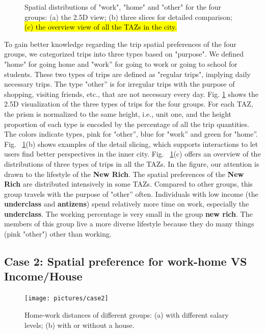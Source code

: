 \documentclass{ieeeaccess}
\begin{document}
\begin{figure}[htb!]
 \caption{Spatial distributions of "work", "home" and "other" for the four groups: (a) the 2.5D view; (b) three slices for detailed comparison; \hl{(c) the overview view of all the TAZs in the city.}}
 \label{case13}
\end{figure}

To gain better knowledge regarding the trip spatial preferences of the four groups, we categorized trips into three types based on "purpose". We defined "home" for going home and "work'' for going to work or going to school for students. These two types of trips are defined as "regular trips", implying daily necessary trips. The type "other'' is for irregular trips with the purpose of shopping, visiting friends, etc., that are not necessary every day. Fig. \ref{case13} shows the 2.5D visualization of the three types of trips for the four groups. For each TAZ, the prism is normalized to the same height, i.e., unit one, and the height proportion of each type is encoded by the percentage of all the trip quantities. The colors indicate types, pink for "other'', blue for "work'' and green for "home''. Fig. ~\ref{case13}(b) shows examples of the detail slicing, which supports interactions to let users find better perspectives in the inner city. Fig. ~\ref{case13}(c) offers an overview of the distributions of three types of trips in all the TAZs. In the figure, our attention is drawn to the lifestyle of the \textbf{New Rich}. The spatial preferences of the \textbf{New Rich} are distributed intensively in some TAZs. Compared to other groups, this group travels with the purpose of "other'' often. Individuals with low income (the \textbf{underclass} and \textbf{antizens}) spend relatively more time on work, especially the \textbf{underclass}. The working percentage is very small in the group \textbf{new rich}. The members of this group live a more diverse lifestyle because they do many things (pink "other") other than working.


\subsection{Case 2: Spatial preference for work-home VS Income/House}


\begin{figure}[htb!]
 \centering
 \texttt{[image: pictures/case2]}
 \caption{Home-work distances of different groups: (a) with different salary levels; (b) with or without a house.}
 \label{case2}
\end{figure}
\end{document}
